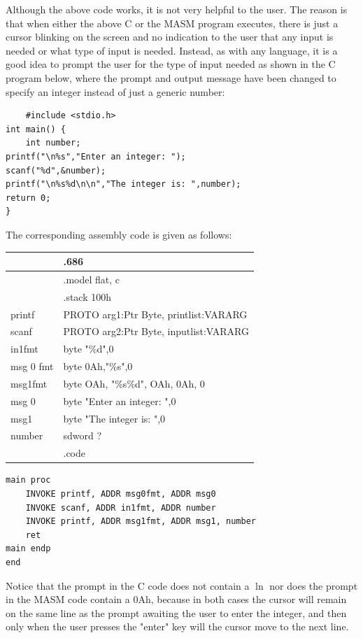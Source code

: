\documentclass[10pt]{book}
\begin{document}
Although the above code works, it is not very helpful to the user. The reason is that when either the above C or the MASM program executes, there is just a cursor blinking on the screen and no indication to the user that any input is needed or what type of input is needed. Instead, as with any language, it is a good idea to prompt the user for the type of input needed as shown in the C program below, where the prompt and output message have been changed to specify an integer instead of just a generic number:

\begin{verbatim}
    #include <stdio.h>
int main() {
    int number;
printf("\n%s","Enter an integer: ");
scanf("%d",&number);
printf("\n%s%d\n\n","The integer is: ",number);
return 0;
}
\end{verbatim}

The corresponding assembly code is given as follows:

\begin{center}
\begin{tabular}{|l|l|}
\hline
 & .686 \\
\hline
 & .model flat, c \\
\hline
 & .stack 100h \\
\hline
printf & PROTO arg1:Ptr Byte, printlist:VARARG \\
\hline
scanf & PROTO arg2:Ptr Byte, inputlist:VARARG \\
\hline
in1fmt & byte "\%d",0 \\
\hline
msg 0 fmt & byte 0Ah,"\%s",0 \\
\hline
msg1fmt & byte OAh, "\%s\%d", OAh, 0Ah, 0 \\
\hline
msg 0 & byte "Enter an integer: ",0 \\
\hline
msg1 & byte "The integer is: ",0 \\
\hline
number & sdword ? \\
\hline
 & .code \\
\hline
\end{tabular}
\end{center}

\begin{verbatim}
main proc
    INVOKE printf, ADDR msg0fmt, ADDR msg0
    INVOKE scanf, ADDR in1fmt, ADDR number
    INVOKE printf, ADDR msg1fmt, ADDR msg1, number
    ret
main endp
end
\end{verbatim}

Notice that the prompt in the C code does not contain a $\ln$ nor does the prompt in the MASM code contain a 0Ah, because in both cases the cursor will remain on the same line as the prompt awaiting the user to enter the integer, and then only when the user presses the "enter" key will the cursor move to the next line.
\end{document}
